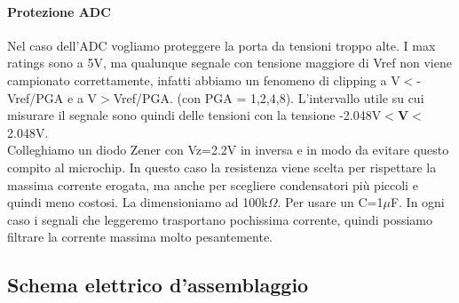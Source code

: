 \documentclass[10pt]{article}
\begin{document}
			\paragraph{Protezione ADC}
				Nel caso dell'ADC vogliamo proteggere la porta da tensioni troppo alte. I max ratings sono a 5V, ma qualunque segnale con tensione maggiore di Vref non viene campionato correttamente,
				infatti abbiamo un fenomeno di clipping a V\(<\)-Vref/PGA e a V\(>\)Vref/PGA. (con PGA = 1,2,4,8).
				L'intervallo utile su cui misurare il segnale sono quindi delle tensioni con la tensione -2.048V\(<\)\textbf{V}\(<\)2.048V.\\
				Colleghiamo un diodo Zener con Vz=2.2V in inversa e in modo da evitare questo compito al microchip.
				In questo caso la resistenza viene scelta per rispettare la massima corrente erogata, ma anche per scegliere condensatori più piccoli e quindi meno costosi.
				La dimensioniamo ad 100k\(\Omega\). Per usare un C=1\(\mu\)F. In ogni caso i segnali che leggeremo trasportano pochissima corrente, quindi possiamo filtrare la corrente massima molto pesantemente.
				
	\subsection{Schema elettrico d'assemblaggio}
\end{document}
